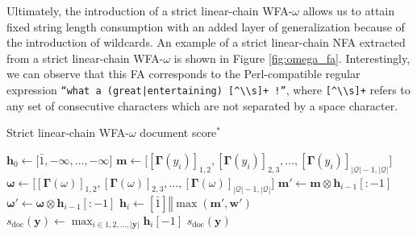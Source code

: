 Ultimately, the introduction of a strict linear-chain WFA-$\omega$ allows us to
attain fixed string length consumption with an added layer of generalization
because of the introduction of wildcards. An example of a strict linear-chain
NFA extracted from a strict linear-chain WFA-$\omega$ is shown in Figure
\ref{fig:omega_fa}. Interestingly, we can observe that this FA corresponds to
the Perl-compatible regular expression \texttt{``what a (great|entertaining)
  [\^{}\textbackslash\textbackslash s]+ !''}, where
\texttt{[\^{}\textbackslash\textbackslash s]+} refers to any set of consecutive
characters which are not separated by a space character.

\begin{algorithm}[t!]
  \small
  \caption{Strict linear-chain WFA-$\omega$ document score$^*$}
  \label{algo:lc_wfa_w_document_score}
  \begin{algorithmic}[1]
    \Statex
    \Begin
    \State $\bm{h}_0 \gets \big[\bar{1}, -\infty, \ldots, -\infty\big]$ 
     
    \State $\bm{m} \gets \big[[\bm{\Gamma}(y_i)]_{1,2}, [\bm{\Gamma}(y_i)]_{2,3}, \ldots,
    [\bm{\Gamma}(y_i)]_{|\mathcal{Q}|-1,|\mathcal{Q}|}\big]$ 
    \State $\bm{\omega} \gets \big[[\bm{\Gamma}(\omega)]_{1,2}, [\bm{\Gamma}(\omega)]_{2,3}, \ldots,
    [\bm{\Gamma}(\omega)]_{|\mathcal{Q}|-1,|\mathcal{Q}|}\big]$
    \State $\bm{m'} \gets \bm{m} \otimes \bm{h}_{i-1}[:-1]$ 
    \State $\bm{\omega'} \gets \bm{\omega} \otimes \bm{h}_{i-1}[:-1]$ 
    \State $\bm{h}_{i} \gets [\bar{1}] \mathbin\Vert \max(\bm{m'}, \bm{w'})$
    \EndFor
    \State $s_{\text{doc}}(\bm{y}) \gets  \max_{i \in 1,2,...,|\bm{y}|}
    \bm{h}_{i}[-1]$
    \State \Return $s_{\text{doc}}(\bm{y})$
    \End
  \end{algorithmic}
\end{algorithm}

